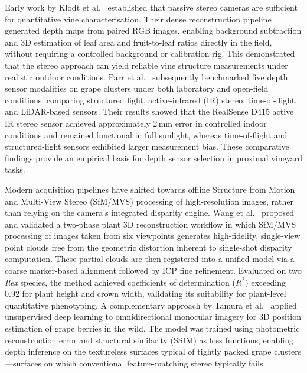 Early work by Klodt et al.~\cite{klodtFieldPhenotypingGrapevine2015} established that passive stereo cameras are sufficient for quantitative vine characterisation. Their dense reconstruction pipeline generated depth maps from paired RGB images, enabling background subtraction and 3D estimation of leaf area and fruit-to-leaf ratios directly in the field, without requiring a controlled background or calibration rig. This demonstrated that the stereo approach can yield reliable vine structure measurements under realistic outdoor conditions. Parr et al.~\cite{parrAnalysisDepthCameras2022} subsequently benchmarked five depth sensor modalities on grape clusters under both laboratory and open-field conditions, comparing structured light, active-infrared (IR) stereo, time-of-flight, and LiDAR-based sensors. Their results showed that the RealSense D415 active IR stereo sensor achieved approximately 2\,mm error in controlled indoor conditions and remained functional in full sunlight, whereas time-of-flight and structured-light sensors exhibited larger measurement bias. These comparative findings provide an empirical basis for depth sensor selection in proximal vineyard tasks.

Modern acquisition pipelines have shifted towards offline Structure from Motion and Multi-View Stereo (SfM/MVS) processing of high-resolution images, rather than relying on the camera's integrated disparity engine. Wang et al.~\cite{wangAccuratePlant3D2025} proposed and validated a two-phase plant 3D reconstruction workflow in which SfM/MVS processing of images taken from six viewpoints generates high-fidelity, single-view point clouds free from the geometric distortion inherent to single-shot disparity computation. These partial clouds are then registered into a unified model via a coarse marker-based alignment followed by ICP fine refinement. Evaluated on two \textit{Ilex} species, the method achieved coefficients of determination ($R^2$) exceeding 0.92 for plant height and crown width, validating its suitability for plant-level quantitative phenotyping. A complementary approach by Tamura et al.~\cite{tamuraUnsupervisedMonocularDepth2025} applied unsupervised deep learning to omnidirectional monocular imagery for 3D position estimation of grape berries in the wild. The model was trained using photometric reconstruction error and structural similarity (SSIM) as loss functions, enabling depth inference on the textureless surfaces typical of tightly packed grape clusters---surfaces on which conventional feature-matching stereo typically fails.

